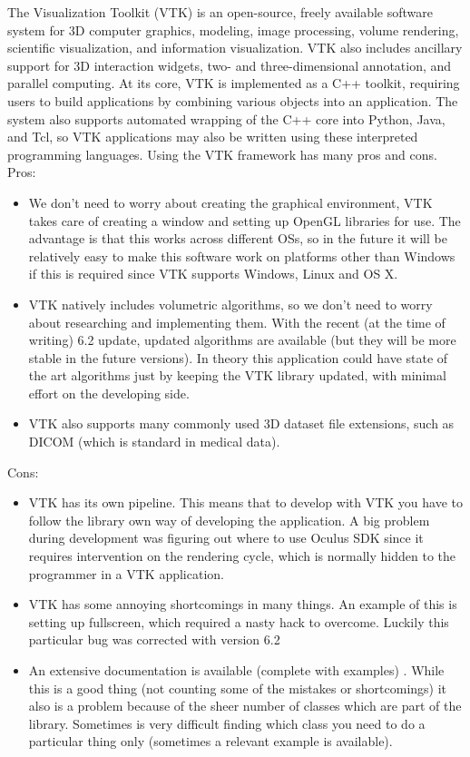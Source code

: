 \documentclass[11pt]{article} %
\begin{document}
The Visualization Toolkit (VTK) is an open-source, freely available software system for 3D computer graphics, modeling, image processing, volume rendering, scientific visualization, and information visualization. VTK also includes ancillary support for 3D interaction widgets, two- and three-dimensional annotation, and parallel computing. At its core, VTK is implemented as a C++ toolkit, requiring users to build applications by combining various objects into an application. The system also supports automated wrapping of the C++ core into Python, Java, and Tcl, so VTK applications may also be written using these interpreted programming languages.
Using the VTK framework has many pros and cons.
Pros:
\begin{itemize}
\item We don't need to worry about creating the graphical environment, VTK takes care of creating a window and setting up OpenGL libraries for use. The advantage is that this works across different OSs, so in the future it will be relatively easy to make this software work on platforms other than Windows if this is required since VTK supports Windows, Linux and OS X.
\item VTK natively includes volumetric algorithms, so we don't need to worry about researching and implementing them. With the recent (at the time of writing) 6.2 update, updated algorithms are available (but they will be more stable in the future versions). In theory this application could have state of the art algorithms just by keeping the VTK library updated, with minimal effort on the developing side.
\item VTK also supports many commonly used 3D dataset file extensions, such as DICOM (which is standard in medical data).
\end{itemize}
Cons:
\begin{itemize}
\item VTK has its own pipeline. This means that to develop with VTK you have to follow the library own way of developing the application. A big problem during development was figuring out where to use Oculus SDK since it requires intervention on the rendering cycle, which is normally hidden to the programmer in a VTK application.
\item VTK has some annoying shortcomings in many things. An example of this is setting up fullscreen, which required a nasty hack to overcome. Luckily this particular bug was corrected with version 6.2
\item An extensive documentation is available (complete with examples) . While this is a good thing (not counting some of the mistakes or shortcomings) it also is a problem because of the sheer number of classes which are part of the library. Sometimes is very difficult finding which class you need to do a particular thing only (sometimes a relevant example is available).
\end{itemize}
\end{document}
